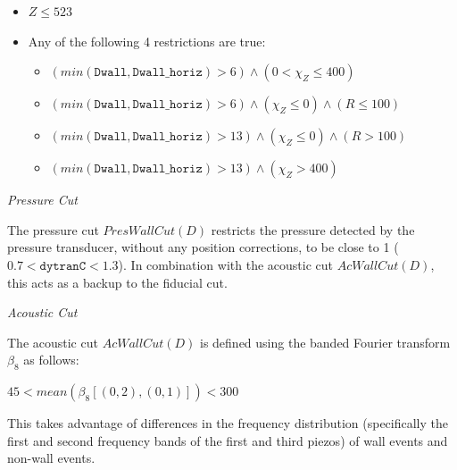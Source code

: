 \documentclass[10pt]{article}
\begin{document}
\begin{itemize}
    \item $Z \leq 523$
    \item Any of the following 4 restrictions are true:
    \begin{itemize}
        \item $(min(\texttt{Dwall}, \texttt{Dwall\_horiz}) > 6) \land (0 < \chi_{Z} \leq 400)$
        \item $(min(\texttt{Dwall}, \texttt{Dwall\_horiz}) > 6) \land (\chi_{Z} \leq 0) \land (R \leq 100)$
        \item $(min(\texttt{Dwall}, \texttt{Dwall\_horiz}) > 13) \land (\chi_{Z} \leq 0) \land (R > 100)$
        \item $(min(\texttt{Dwall}, \texttt{Dwall\_horiz}) > 13) \land (\chi_{Z} > 400)$
    \end{itemize}
\end{itemize}

\textit{Pressure Cut}

The pressure cut $PresWallCut(D)$ restricts the pressure detected by the pressure transducer, without any position corrections, to be close to 1 ($0.7<\texttt{dytranC}<1.3$). In combination with the acoustic cut $AcWallCut(D)$, this acts as a backup to the fiducial cut.

\textit{Acoustic Cut}

The acoustic cut $AcWallCut(D)$ is defined using the banded Fourier transform $\beta_{8}$ as follows:

$45 < mean(\beta_{8}[(0, 2), (0, 1)]) < 300$

This takes advantage of differences in the frequency distribution (specifically the first and second frequency bands of the first and third piezos) of wall events and non-wall events.
\end{document}
